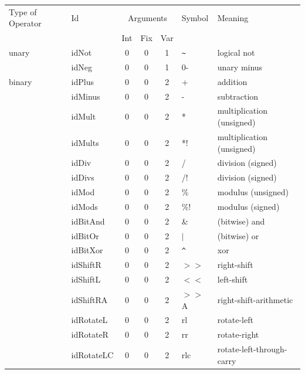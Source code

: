 \centerfigbegin
\begin{tabular}{|l|l|c|c|c|l|l|} \hline
Type of Operator & Id       &
\multicolumn{3}{c|}{Arguments}
& Symbol    & Meaning \\ \cline{3-5}
    &   & Int & Fix & Var & & \\
\hline
unary       & idNot         &0&0&1  & \verb!~!  & logical not \\
            & idNeg         &0&0&1  & 0-        & unary minus \\
\hline
binary      & idPlus        &0&0&2  & +         & addition \\
            & idMinus       &0&0&2  & -         & subtraction \\
            & idMult        &0&0&2  & *         & multiplication (unsigned)\\
            & idMults       &0&0&2  & *!        & multiplication (unsigned)\\
            & idDiv         &0&0&2  & /         & division (signed) \\
            & idDivs        &0&0&2  & /!        & division (signed) \\
            & idMod         &0&0&2  & \%        & modulus (unsigned) \\ 
            & idMods        &0&0&2  & \%!       & modulus (signed) \\ 
            & idBitAnd      &0&0&2  & \&        & (bitwise) and \\
            & idBitOr       &0&0&2  & $|$       & (bitwise) or \\
            & idBitXor      &0&0&2  & \verb!^!  & xor \\
            & idShiftR      &0&0&2  & $>>$      & right-shift \\
            & idShiftL      &0&0&2  & $<<$      & left-shift \\
            & idShiftRA     &0&0&2  & $>>$A     & right-shift-arithmetic \\
            & idRotateL     &0&0&2  & rl        & rotate-left \\
            & idRotateR     &0&0&2  & rr        & rotate-right \\
            & idRotateLC    &0&0&2  & rlc       & rotate-left-through-carry \\

\end{tabular}
